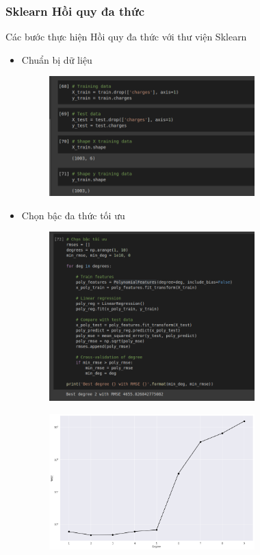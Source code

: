 \documentclass{article}
\begin{document}
	\subsubsection{Sklearn Hồi quy đa thức}
	Các bước thực hiện Hồi quy đa thức với thư viện Sklearn
	\begin{itemize}
		\item Chuẩn bị dữ liệu
		\begin{figure}[H]
			\centering
			\includegraphics[width=0.75\textwidth]{images/polynomial_reg/poly_data_preparation.png}
		\end{figure}
		\item Chọn bậc đa thức tối ưu
		\begin{figure}[H]
			\centering
			\includegraphics[width=0.75\textwidth]{images/polynomial_reg/poly_reg_choose_degree.png}
		\end{figure}
		\begin{figure}[H]
			\centering
			\includegraphics[width=0.75\textwidth]{images/polynomial_reg/poly_choose_degree.png}

\end{figure}
\end{itemize}
\end{document}
